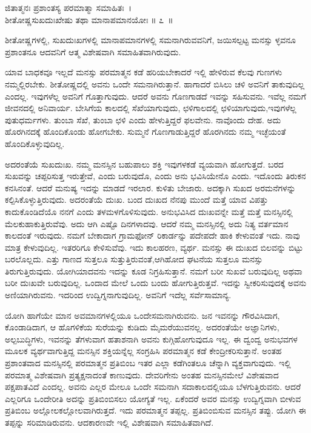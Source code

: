 \begin{shloka}
ಜಿತಾತ್ಮನಃ ಪ್ರಶಾಂತಸ್ಯ ಪರಮಾತ್ಮಾ ಸಮಾಹಿತಃ~।\\ಶೀತೋಷ್ಣಸುಖದುಃಖೇಷು ತಥಾ ಮಾನಾಪಮಾನಯೋಃ \hfill॥ ೭~॥
\end{shloka}

\begin{artha}
ಶೀತೋಷ್ಣಗಳಲ್ಲಿ, ಸುಖದುಃಖಗಳಲ್ಲಿ ಮಾನಾಪಮಾನಗಳಲ್ಲಿ ಸಮನಾಗಿರುವವನಿಗೆ, ಜಯಿಸಲ್ಪಟ್ಟ ಮನಸ್ಸು ಳ್ಳವನೂ ಪ್ರಶಾಂತನೂ ಆದವನಿಗೆ ಆತ್ಮ ವಿಶೇಷವಾಗಿ ಸಮಾಹಿತವಾಗಿರುವುದು.
\end{artha}

ಯಾವ ಬಾಧಕವೂ ಇಲ್ಲದೆ ಮನಸ್ಸು ಪರಮಾತ್ಮನ ಕಡೆ ಹರಿಯಬೇಕಾದರೆ ಇಲ್ಲಿ ಹೇಳಿರುವ ಕೆಲವು ಗುಣಗಳು ನಮ್ಮಲ್ಲಿರಬೇಕು. ಶೀತೋಷ್ಣದಲ್ಲಿ ಅವನು ಒಂದೇ ಸಮನಾಗಿರುತ್ತಾನೆ. ಹಾಗಾದರೆ ಬಿಸಿಲು ಚಳಿ ಅವನಿಗೆ ತಾಕುವುದಿಲ್ಲ ಎಂದಲ್ಲ. ಇವುಗಳೆಲ್ಲ ಅವನಿಗೆ ಗೊತ್ತಾಗುವುದು. ಆದರೆ ಅವನು ಗೊಣಗಾಡದೆ ಇವನ್ನು ಸಹಿಸುವನು. ಇವೆಲ್ಲ ನಮಗೆ ಜೀವನದಲ್ಲಿ ಅನಿವಾರ್ಯ. ಬೇಸಿಗೆಯ ಕಾಲದಲ್ಲಿ ಸೆಖೆಯಾಗುವುದು, ಛಳಿಗಾಲದಲ್ಲಿ ಛಳಿಯಾಗುವುದು,\break ಇವುಗಳೆಲ್ಲ ಪುತುಧರ್ಮಗಳು. ತುಂಬಾ ಸೆಖೆ, ತುಂಬಾ ಛಳಿ ಎಂದು ಹೇಳುತ್ತಿದ್ದರೆ ಫಲವೇನು. ನಾವೊಂದು ದೇಹ. ಅದು ಹೊರಗಿನದಕ್ಕೆ ಹೊಂದಿಕೊಂಡು ಹೋಗಬೇಕು. ಸುಮ್ಮನೆ ಗೊಣಗಾಡು\-ತ್ತಿದ್ದರೆ ಹೊರಗಿನದು ನಮ್ಮ ಇಚ್ಛೆಯಂತೆ ಹೊಂದಿಕೊಳ್ಳುವುದಿಲ್ಲ.

ಅದರಂತೆಯೆ ಸುಖದುಃಖ. ನಮ್ಮ ಮನಸ್ಸಿನ ಬಹುಪಾಲು ಶಕ್ತಿ ಇವುಗಳಕಡೆ ವ್ಯಯವಾಗಿ ಹೋಗುತ್ತದೆ. ಬರದ ಸುಖವನ್ನು ಚಪ್ಪರಿಸುತ್ತ ಇರುತ್ತೇವೆ, ಎಂದು ಬರುವುದೊ, ಎಂದು ಅನು ಭವಿಸಿಯೇನೊ ಎಂದು. ಇದೊಂದು ತಿರುಕನ ಕನಸಿನಂತೆ. ಆದರೆ ಮನುಷ್ಯ ಇದನ್ನು ಮಾಡದೆ ಇರಲಾರ. ಕುಳಿತು ಬೇಜಾರು. ಅದಕ್ಕಾಗಿ ಸುಖದ ಅರಮನೆಗಳನ್ನು ಕಲ್ಪಿಸಿಕೊಳ್ಳುತ್ತಿರುವುದು. ಅದರಂತೆಯೆ ದುಃಖ. ಬಂದ ದುಃಖದ ನೆನಪು ಮುಂದೆ ಮತ್ತೆ ಯಾವ ವಿಪತ್ತು ಕಾದುಕೊಂಡಿದೆಯೊ ನನಗೆ ಎಂದು ತಳಮಳಗೊಳಿಸುವುದು. ಅನುಭವಿಸಿದ ದುಃಖವನ್ನೇ ಮತ್ತೆ ಮತ್ತೆ ಮನಸ್ಸಿನಲ್ಲಿ ಮೆಲಕುಹಾಕುತ್ತಿರುವೆವು. ಅದು ಆಗಿ ಎಷ್ಟೊ ದಿನಗಳಾದವು. ಆದರೆ ನಮ್ಮ ಮನಸ್ಸಿನಲ್ಲಿ ಅದು ನಿತ್ಯ ವರ್ತಮಾನ ಕಾಲದಂತೆ ಇರುವುದು. ನಮಗೆ ಬೇಕಾದಾಗ ಗ್ರಾಮಫೋನ್ ರಿಕಾರ್ಡನ್ನು ಪದೇಪದೇ ಹಾಕಿ ಕೇಳುವಂತೆ ಇದು. ನಾವು ಮಾತ್ರ ಕೇಳುವುದಿಲ್ಲ. ಇತರರಿಗೂ ಕೇಳಿಸುವೆವು. ಇದು ಕಾಲಹರಣ, ವ್ಯರ್ಥ. ಮನಸ್ಸು ಈ ದುಃಖದ ಬಿಲವನ್ನು ಬಿಟ್ಟು ಬರಲೊಲ್ಲದು. ಎತ್ತು ಗಾಣದ ಸುತ್ತಲೂ ಸುತ್ತುತ್ತಿರುವಂತೆ,ಆಗಿಹೋದ ಘಟನೆಯ ಸುತ್ತಲೂ ಮನಸ್ಸು ತಿರುಗುತ್ತಿರುವುದು. ಯೋಗಿಯಾದವನು ಇದನ್ನು ಕೂಡ ನಿಗ್ರಹಿಸುತ್ತಾನೆ. ನಮಗೆ ಬರೀ ಸುಖವೆ ಬರುವುದಿಲ್ಲ ಅಥವಾ ಬರೀ ದುಃಖವೇ ಬರುವುದಿಲ್ಲ. ಒಂದಾದ ಮೇಲೆ ಒಂದು ಬಂದು ಹೋಗುತ್ತಿರುತ್ತವೆ. ಇದನ್ನು ಸ್ವೀಕರಿಸುವುದಕ್ಕೆ ಅವನು ಅಣಿಯಾಗಿರುವನು. ಇದರಿಂದ ಉದ್ವಿಗ್ನನಾಗುವುದಿಲ್ಲ. ಅವನಿಗೆ ಇದೆಲ್ಲ ಸರ್ವೆಸಾಮಾನ್ಯ.

ಯೋಗಿ ಹಾಗೆಯೇ ಮಾನ ಅವಮಾನಗಳಲ್ಲಿಯೂ ಒಂದೇಸಮನಾಗಿರುವನು. ಜನ ಇವನನ್ನು ಗೌರವಿಸಿದಾಗ, ಕೊಂಡಾಡಿದಾಗ, ಆ ಹೊಗಳಿಕೆಯ ಸುರೆಯನ್ನು ಕುಡಿದು ಮೈಮರೆಯು\-ವನಲ್ಲ. ಅದರಂತೆಯೇ ಅಜ್ಞಾನಿಗಳು, ಅಲ್ಪಬುದ್ಧಿಗಳು, ಇವನನ್ನು ತೆಗಳುವಾಗ ಹತಾಶನಾಗಿ ಅವನು ಕುಗ್ಗಿಹೋಗುವುದೂ ಇಲ್ಲ. ಈ ದ್ವಂದ್ವ ಅನುಭವಗಳ ಮೂಲಕ ವ್ಯರ್ಥವಾಗುತ್ತಿದ್ದ ಮನಸ್ಸಿನ ಶಕ್ತಿಯನ್ನೆಲ್ಲ ಸಂಗ್ರಹಿಸಿ ಪರಮಾತ್ಮನ ಕಡೆ ಕೇಂದ್ರೀಕರಿಸುತ್ತಾನೆ. ಅಂತಹ ಪ್ರಶಾಂತವಾದ ಮನಸ್ಸಿನಲ್ಲಿ ಪರಮಾತ್ಮನ ಪ್ರತಿಬಿಂಬ ಇತರ ಎಲ್ಲಾ ಕಡೆಗಿಂತಲೂ ಚೆನ್ನಾಗಿ ವ್ಯಕ್ತವಾಗುವುದು. ಇಲ್ಲಿ ಪರಮಾತ್ಮ ವಿಶೇಷವಾಗಿ ಪ್ರತ್ಯಕ್ಷನಾದಂತೆ ಕಾಣುವುದು. ದೇವರಿಗೇನು ಅಂತಹ ಮನಸ್ಸಿನಮೇಲೆ ವಿಶೇಷವಾದ ಪಕ್ಷಪಾತವಿದೆ ಎಂದಲ್ಲ. ಅವನು ಎಲ್ಲರ ಮೇಲೂ ಒಂದೇ ಸಮನಾಗಿ ಸದಾಕಾಲದಲ್ಲಿಯೂ ಬೆಳಗುತ್ತಿರುವನು. ಆದರೆ ಎಲ್ಲರಿಗೂ ಒಂದೇರೀತಿ ಅದನ್ನು ಪ್ರತಿಬಿಂಬಿಸಲು ಯೋಗ್ಯತೆ ಇಲ್ಲ. ಏಕೆಂದರೆ ಅವರ ಮನಸ್ಸು ಉದ್ವಿಗ್ನವಾಗಿ ಬೀಳುವ ಪ್ರತಿಬಿಂಬ ಅಲ್ಲೋಲಕಲ್ಲೋಲವಾಗಿರುತ್ತದೆ. ಇದು ಪರಮಾತ್ಮನ ತಪ್ಪಲ್ಲ. ಪ್ರತಿಬಿಂಬಿಸುವ ಮನಸ್ಸಿನ ತಪ್ಪು. ಯೋಗಿ ಈ ತಪ್ಪನ್ನು ಸರಿಮಾಡಿರುವನು. ಆದಕಾರಣವೇ ಇಲ್ಲಿ ವಿಶೇಷವಾಗಿ ಸಮಾಹಿತವಾಗಿದೆ.

